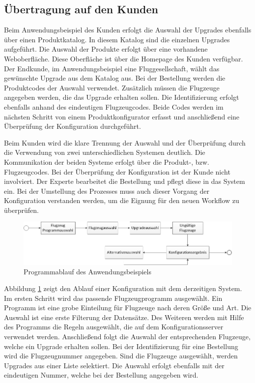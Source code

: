 \subsection{Übertragung auf den Kunden}
Beim Anwendungsbeispiel des Kunden erfolgt die Auswahl der Upgrades ebenfalls über einen Produktkatalog. In diesem Katalog sind die einzelnen Upgrades aufgeführt. Die Auswahl der Produkte erfolgt über eine vorhandene Weboberfläche. Diese Oberfläche ist über die Homepage des Kunden verfügbar. Der Endkunde, im Anwendungsbeispiel eine Fluggesellschaft, wählt das gewünschte Upgrade aus dem Katalog aus. Bei der Bestellung werden die Produktcodes der Auswahl verwendet. Zusätzlich müssen die Flugzeuge angegeben werden, die das Upgrade erhalten sollen. Die Identifizierung erfolgt ebenfalls anhand des eindeutigen Flugzeugcodes. Beide Codes werden im nächsten Schritt von einem Produktkonfigurator erfasst und anschließend eine Überprüfung der Konfiguration durchgeführt.   \par 

Beim Kunden wird die klare Trennung der Auswahl und der Überprüfung durch die Verwendung von zwei unterschiedlichen Systemen deutlich. Die Kommunikation der beiden Systeme erfolgt über die Produkt-, bzw. Flugzeugcodes. Bei der Überprüfung der Konfiguration ist der Kunde  nicht involviert. Der Experte bearbeitet die Bestellung und pflegt diese in das System ein. Bei der Umstellung des Prozesses muss auch dieser Vorgang der Konfiguration verstanden werden, um die Eignung für den neuen Workflow zu überprüfen. \par 
\begin{figure}[H]
\centering
\includegraphics[width=\hsize]{images/workflow_webgui}
\caption{Programmablauf des Anwendungsbeispiels}
\label{webguiAblauf}
\end{figure}

Abbildung \ref{webguiAblauf} zeigt den Ablauf einer Konfiguration mit dem derzeitigen System.
Im ersten Schritt wird das passende Flugzeugprogramm ausgewählt. Ein Programm ist eine grobe Einteilung für Flugzeuge nach deren Größe und Art. Die Auswahl ist eine erste Filterung der Datensätze. Des Weiteren werden mit Hilfe des Programms die Regeln ausgewählt, die auf dem Konfigurationsserver verwendet werden. Anschließend folgt die Auswahl der entsprechenden Flugzeuge, welche ein Upgrade erhalten sollen. Bei der Identifizierung für eine Bestellung wird die Flugzeugnummer angegeben. Sind die Flugzeuge ausgewählt, werden Upgrades aus einer Liste selektiert. Die Auswahl erfolgt ebenfalls mit der eindeutigen Nummer, welche bei der Bestellung angegeben wird. \par 

